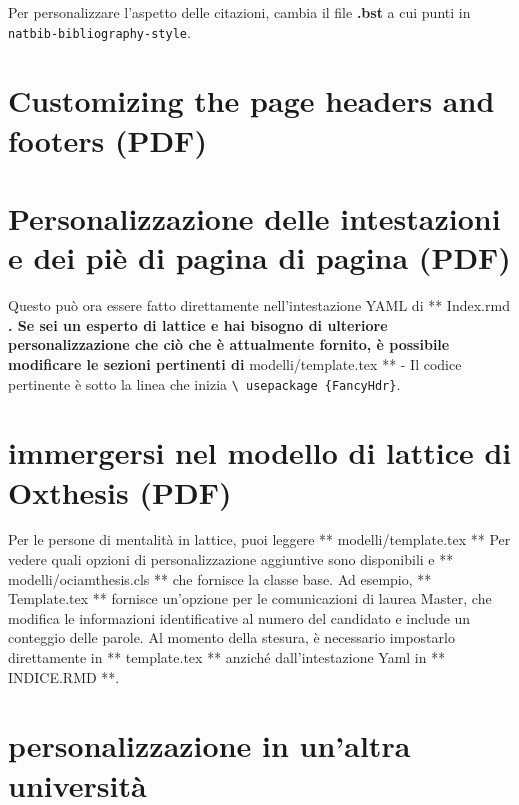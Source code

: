 \documentclass[a4paper, 11pt, nobind]{templates/ociamthesis}
\begin{document}
Per personalizzare l'aspetto delle citazioni, cambia il file \textbf{.bst} a cui punti in \texttt{natbib-bibliography-style}.

\hypertarget{customizing-the-page-headers-and-footers-pdf}{%
\section{Customizing the page headers and footers (PDF)}\label{customizing-the-page-headers-and-footers-pdf}}

\hypertarget{personalizzazione-delle-intestazioni-e-dei-piuxe8-di-pagina-di-pagina-pdf}{%
\section{Personalizzazione delle intestazioni e dei piè di pagina di pagina (PDF)}\label{personalizzazione-delle-intestazioni-e-dei-piuxe8-di-pagina-di-pagina-pdf}}

Questo può ora essere fatto direttamente nell'intestazione YAML di ** Index.rmd \textbf{.
Se sei un esperto di lattice e hai bisogno di ulteriore personalizzazione che ciò che è attualmente fornito, è possibile modificare le sezioni pertinenti di } modelli/template.tex ** - Il codice pertinente è sotto la linea che inizia \texttt{\textbackslash{}\ usepackage\ \{FancyHdr\}}.

\hypertarget{immergersi-nel-modello-di-lattice-di-oxthesis-pdf}{%
\section{immergersi nel modello di lattice di Oxthesis (PDF)}\label{immergersi-nel-modello-di-lattice-di-oxthesis-pdf}}

Per le persone di mentalità in lattice, puoi leggere ** modelli/template.tex ** Per vedere quali opzioni di personalizzazione aggiuntive sono disponibili e ** modelli/ociamthesis.cls ** che fornisce la classe base.
Ad esempio, ** Template.tex ** fornisce un'opzione per le comunicazioni di laurea Master, che modifica le informazioni identificative al numero del candidato e include un conteggio delle parole.
Al momento della stesura, è necessario impostarlo direttamente in ** template.tex ** anziché dall'intestazione Yaml in ** INDICE.RMD **.

\hypertarget{personalizzazione-in-unaltra-universituxe0}{%
\section{personalizzazione in un'altra università}\label{personalizzazione-in-unaltra-universituxe0}}
\end{document}
